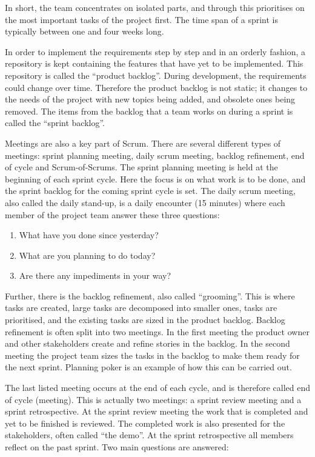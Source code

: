 In short, the team concentrates on isolated parts, and through this prioritises on the most important tasks of the project first. The time span of a sprint is typically between one and four weeks long.

In order to implement the requirements step by step and in an orderly fashion, a repository is kept containing the features that have yet to be implemented. This repository is called the ``product backlog''. During development, the requirements could change over time. Therefore the product backlog is not static; it changes to the needs of the project with new topics being added, and obsolete ones being removed. The items from the backlog that a team works on during a sprint is called the ``sprint backlog''.

Meetings are also a key part of Scrum. There are several different types of meetings: sprint planning meeting, daily scrum meeting, backlog refinement, end of cycle and Scrum-of-Scrums. The sprint planning meeting is held at the beginning of each sprint cycle. Here the focus is on what work is to be done, and the sprint backlog for the coming sprint cycle is set. The daily scrum meeting, also called the daily stand-up, is a daily encounter (15 minutes) where each member of the project team answer these three questions:

\begin{enumerate}
  \item What have you done since yesterday?
  \item What are you planning to do today?
  \item Are there any impediments in your way?
\end{enumerate}

Further, there is the backlog refinement, also called ``grooming''. This is where tasks are created, large tasks are decomposed into smaller ones, tasks are prioritised, and the existing tasks are sized in the product backlog. Backlog refinement is often split into two meetings. In the first meeting the product owner and other stakeholders create and refine stories in the backlog. In the second meeting the project team sizes the tasks in the backlog to make them ready for the next sprint. Planning poker is an example of how this can be carried out.

The last listed meeting occurs at the end of each cycle, and is therefore called end of cycle (meeting). This is actually two meetings: a sprint review meeting and a sprint retrospective. At the sprint review meeting the work that is completed and yet to be finished is reviewed. The completed work is also presented for the stakeholders, often called  ``the demo''. At the sprint retrospective all members reflect on the past sprint. Two main questions are answered:

